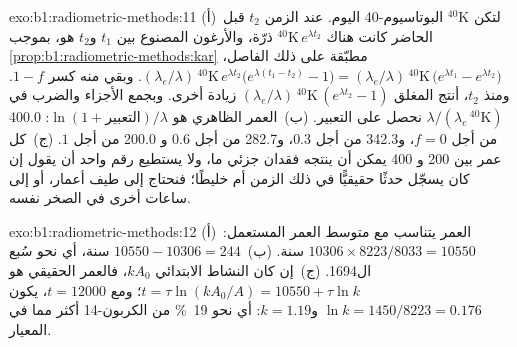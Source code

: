 \begin{solution}{exo:b1:radiometric-methods:11}
(أ)~لتكن ${}^{40}\mathrm{K}$ البوتاسيوم-40 اليوم. عند الزمن $t_2$ قبل الحاضر كانت هناك ${}^{40}\mathrm{K}\,e^{\lambda t_2}$ ذرّة، والأرغون المصنوع بين $t_1$ و$t_2$ هو، بموجب \cref{prop:b1:radiometric-methods:kar} مطبّقة على ذلك الفاصل، $(\lambda_e/\lambda)\,{}^{40}\mathrm{K}\,e^{\lambda
t_2}\bigl(e^{\lambda (t_1 - t_2)} - 1\bigr) = (\lambda_e/\lambda)\,
{}^{40}\mathrm{K}\,\bigl(e^{\lambda t_1} - e^{\lambda t_2}\bigr)$. وبقي منه كسر
$1 - f$. ومنذ $t_2$، أنتج  المغلق
$(\lambda_e/\lambda)\,{}^{40}\mathrm{K}\,(e^{\lambda t_2} - 1)$ زيادة أخرى. وبجمع الأجزاء والضرب في $\lambda/(\lambda_e\,{}^{40}\mathrm{K})$ نحصل على التعبير.
(ب)~العمر الظاهري هو $\ln(1 + \text{التعبير})/\lambda$: \qty{400.0}{\Myr} من أجل
$f = 0$، و\qty{342.3}{\Myr} من أجل $0.3$، و\qty{282.7}{\Myr} من أجل $0.6$ و
\qty{200.0}{\Myr} من أجل $1$. (ج)~كل عمر بين \qty{200}{\Myr} و
\qty{400}{\Myr} يمكن أن ينتجه فقدان جزئي ما، ولا يستطيع رقم واحد أن يقول إن كان يسجّل حدثًا حقيقيًّا في ذلك الزمن أم خليطًا؛ فنحتاج إلى طيف أعمار، أو إلى ساعات أخرى في الصخر نفسه.
\end{solution}

\begin{solution}{exo:b1:radiometric-methods:12}
(أ)~العمر يتناسب مع متوسط العمر المستعمل: $10306 \times 8223/8033 =
\num{10550}$ سنة. (ب)~$10550 - 10306 = 244$ سنة، أي نحو سُبع ال\num{1694}. (ج)~إن كان النشاط الابتدائي $k A_0$، فالعمر الحقيقي هو $t = \tau
\ln(k A_0/A) = \num{10550} + \tau \ln k$؛ ومع $t = \num{12000}$، يكون $\ln k =
1450/8223 = 0.176$ و$k = 1.19$: أي نحو \qty{19}{\percent} من الكربون-14 أكثر مما في المعيار.
\end{solution}

